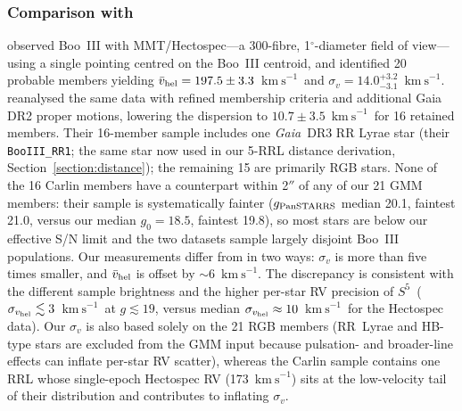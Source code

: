 \documentclass[twocolumn, apj, numberedappendix, appendixfloats]{openjournal_dhayaa}
\newcommand{\SSSSS}{${S}^5$\xspace}
\newcommand{\gaia}{\textit{Gaia}\xspace}
\newcommand{\vlosUnits}{$\mathrm{km~s}^{-1}$\xspace}
\begin{document}
\subsubsection{Comparison with \citet{Carlin2009, Carlin2018}}
\citet{Carlin2009} observed Boo~III with MMT/Hectospec---a 300-fibre, 1$^\circ$-diameter field of view---using a single pointing centred on the Boo~III centroid, and identified 20 probable members yielding $\bar v_{\rm hel} = 197.5 \pm 3.3$~\vlosUnits\ and $\sigma_v = 14.0^{+3.2}_{-3.1}$~\vlosUnits.  \citet{Carlin2018} reanalysed the same data with refined membership criteria and additional Gaia DR2 proper motions, lowering the dispersion to $10.7 \pm 3.5$~\vlosUnits\ for 16 retained members.  Their 16-member sample includes one \gaia\ DR3 RR Lyrae star (their \texttt{BooIII\_RR1}; the same star now used in our 5-RRL distance derivation, Section~\ref{section:distance}); the remaining 15 are primarily RGB stars.  None of the 16 Carlin members have a counterpart within 2$''$ of any of our 21 GMM members: their sample is systematically fainter ($g_{\rm PanSTARRS}$ median 20.1, faintest 21.0, versus our median $g_0 = 18.5$, faintest 19.8), so most stars are below our effective S/N limit and the two datasets sample largely disjoint Boo~III populations.  Our measurements differ from \citet{Carlin2018} in two ways: $\sigma_v$ is more than five times smaller, and $\bar v_{\rm hel}$ is offset by $\sim 6$~\vlosUnits.  The discrepancy is consistent with the different sample brightness and the higher per-star RV precision of \SSSSS\ ($\sigma_{v_{\rm hel}} \lesssim 3$~\vlosUnits\ at $g \lesssim 19$, versus median $\sigma_{v_{\rm hel}} \approx 10$~\vlosUnits\ for the Hectospec data).  Our $\sigma_v$ is also based solely on the 21 RGB members (RR~Lyrae and HB-type stars are excluded from the GMM input because pulsation- and broader-line effects can inflate per-star RV scatter), whereas the Carlin sample contains one RRL whose single-epoch Hectospec RV (173~\vlosUnits) sits at the low-velocity tail of their distribution and contributes to inflating $\sigma_v$.
\end{document}
